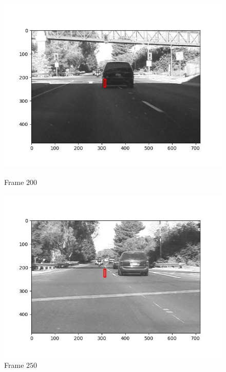 \begin{figure}[H]
\begin{minipage}{.49\textwidth}
    \includegraphics[width=\textwidth]{./figures/ic_affine/car1/frame000200.jpg}
    \caption{Frame $200$}
  \end{minipage}
  \hfill
  \begin{minipage}{.49\textwidth}
    \centering
    \includegraphics[width=\textwidth]{./figures/ic_affine/car1/frame000250.jpg}
    \caption{Frame $250$}
  \end{minipage}
\end{figure}


